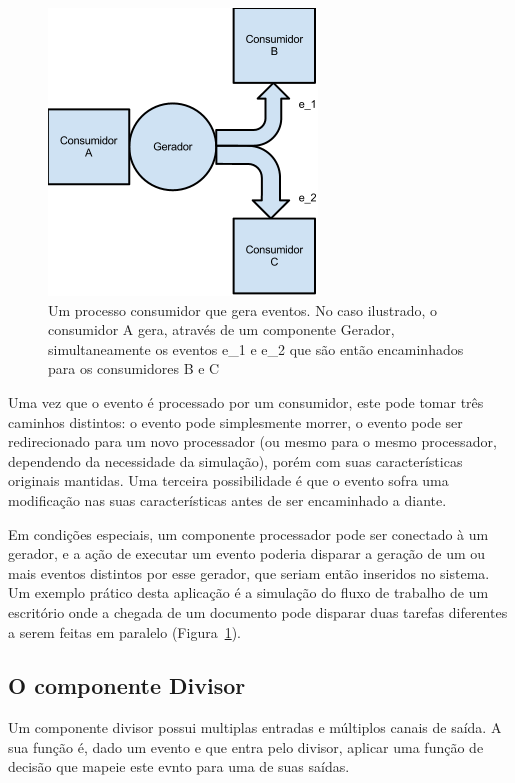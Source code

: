 \begin{figure}
  \centerline{\includegraphics{gerador_mais_consumidor.png}}
  \caption{Um processo consumidor que gera eventos. No caso ilustrado, o consumidor A gera, através de um componente Gerador, simultaneamente os eventos e\_1 e e\_2 que são então encaminhados para os consumidores B e C}
\label{fig:multiple_sons}
\end{figure}

Uma vez que o evento é processado por um consumidor, este pode tomar três caminhos distintos: o evento pode simplesmente morrer, o evento pode ser redirecionado para um novo processador (ou mesmo para o mesmo processador, dependendo da necessidade da simulação), porém com suas características originais mantidas. Uma terceira possibilidade é que o evento sofra uma modificação nas suas características antes de ser encaminhado a diante.

Em condições especiais, um componente processador pode ser conectado à um gerador, e a ação de executar um evento poderia disparar a geração de um ou mais eventos distintos por esse gerador, que seriam então inseridos no sistema. Um exemplo prático desta aplicação é a simulação do fluxo de trabalho de um escritório onde a chegada de um documento pode disparar duas tarefas diferentes a serem feitas em paralelo (Figura~\ref{fig:multiple_sons}).


\subsection{O componente Divisor \label{divisor}}

Um componente divisor possui multiplas entradas e múltiplos canais de saída. A sua função é, dado um evento e que entra pelo divisor, aplicar uma função de decisão que mapeie este evnto para uma de suas saídas.

